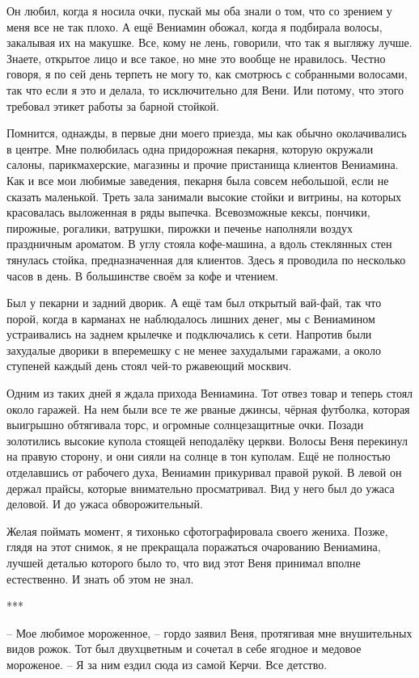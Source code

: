 \documentclass[
]{book}
\begin{document}
Он любил, когда я носила очки, пускай мы оба знали о том, что со зрением у меня все не так плохо. А ещё Вениамин обожал, когда я подбирала волосы, закалывая их на макушке. Все, кому не лень, говорили, что так я выгляжу лучше. Знаете, открытое лицо и все такое, но мне это вообще не нравилось. Честно говоря, я по сей день терпеть не могу то, как смотрюсь с собранными волосами, так что если я это и делала, то исключительно для Вени. Или потому, что этого требовал этикет работы за барной стойкой.

Помнится, однажды, в первые дни моего приезда, мы как обычно околачивались в центре. Мне полюбилась одна придорожная пекарня, которую окружали салоны, парикмахерские, магазины и прочие пристанища клиентов Вениамина. Как и все мои любимые заведения, пекарня была совсем небольшой, если не сказать маленькой. Треть зала занимали высокие стойки и витрины, на которых красовалась выложенная в ряды выпечка. Всевозможные кексы, пончики, пирожные, рогалики, ватрушки, пирожки и печенье наполняли воздух праздничным ароматом. В углу стояла кофе-машина, а вдоль стеклянных стен тянулась стойка, предназначенная для клиентов. Здесь я проводила по несколько часов в день. В большинстве своём за кофе и чтением.

Был у пекарни и задний дворик. А ещё там был открытый вай-фай, так что порой, когда в карманах не наблюдалось лишних денег, мы с Вениамином устраивались на заднем крылечке и подключались к сети. Напротив были захудалые дворики в вперемешку с не менее захудалыми гаражами, а около ступеней каждый день стоял чей-то ржавеющий москвич.

Одним из таких дней я ждала прихода Вениамина. Тот отвез товар и теперь стоял около гаражей. На нем были все те же рваные джинсы, чёрная футболка, которая выигрышно обтягивала торс, и огромные солнцезащитные очки. Позади золотились высокие купола стоящей неподалёку церкви. Волосы Веня перекинул на правую сторону, и они сияли на солнце в тон куполам. Ещё не полностью отделавшись от рабочего духа, Вениамин прикуривал правой рукой. В левой он держал прайсы, которые внимательно просматривал. Вид у него был до ужаса деловой. И до ужаса обворожительный.

Желая поймать момент, я тихонько сфотографировала своего жениха. Позже, глядя на этот снимок, я не прекращала поражаться очарованию Вениамина, лучшей деталью которого было то, что вид этот Веня принимал вполне естественно. И знать об этом не знал.

***

-- Мое любимое мороженное, -- гордо заявил Веня, протягивая мне внушительных видов рожок. Тот был двухцветным и сочетал в себе ягодное и медовое мороженое. -- Я за ним ездил сюда из самой Керчи. Все детство.
\end{document}
